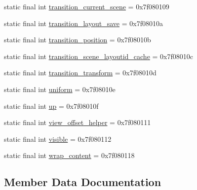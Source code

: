 \begin{DoxyCompactItemize}
\item 
static final int \mbox{\hyperlink{classandroid_1_1support_1_1design_1_1R_1_1id_a75728c7ae11fb924149bcd39c4f7f843}{transition\+\_\+current\+\_\+scene}} = 0x7f080109
\item 
static final int \mbox{\hyperlink{classandroid_1_1support_1_1design_1_1R_1_1id_ae07562594f75d7b832f160869fe9432f}{transition\+\_\+layout\+\_\+save}} = 0x7f08010a
\item 
static final int \mbox{\hyperlink{classandroid_1_1support_1_1design_1_1R_1_1id_af03e341e1ccf6730fff343b035efc176}{transition\+\_\+position}} = 0x7f08010b
\item 
static final int \mbox{\hyperlink{classandroid_1_1support_1_1design_1_1R_1_1id_adf45e834c51610a398a2fc8655464d2a}{transition\+\_\+scene\+\_\+layoutid\+\_\+cache}} = 0x7f08010c
\item 
static final int \mbox{\hyperlink{classandroid_1_1support_1_1design_1_1R_1_1id_ade83b753c44146d78866b5f544249143}{transition\+\_\+transform}} = 0x7f08010d
\item 
static final int \mbox{\hyperlink{classandroid_1_1support_1_1design_1_1R_1_1id_afd2d95e460620b888ef95af5d6a2f47b}{uniform}} = 0x7f08010e
\item 
static final int \mbox{\hyperlink{classandroid_1_1support_1_1design_1_1R_1_1id_a1a22501200657ffeeaa195ac9fd5db8e}{up}} = 0x7f08010f
\item 
static final int \mbox{\hyperlink{classandroid_1_1support_1_1design_1_1R_1_1id_a444601de1ff3abd16c891e62ecd7692a}{view\+\_\+offset\+\_\+helper}} = 0x7f080111
\item 
static final int \mbox{\hyperlink{classandroid_1_1support_1_1design_1_1R_1_1id_a8ae9495679191ce8aa5c91e0c5d11460}{visible}} = 0x7f080112
\item 
static final int \mbox{\hyperlink{classandroid_1_1support_1_1design_1_1R_1_1id_a6e8a85590f5382de4d0dfabf2d8919be}{wrap\+\_\+content}} = 0x7f080118
\end{DoxyCompactItemize}


\subsection{Member Data Documentation}
\mbox{\label{classandroid_1_1support_1_1design_1_1R_1_1id_a65ca78d6559d5c73324d48f61d2af87e}} 
